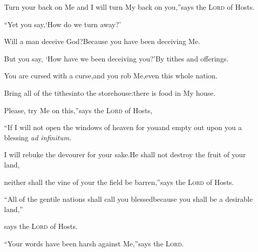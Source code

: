 \begin{inparaenum}
  \pb Turn your back on Me and I will turn My back on you,''\pa says the \textsc{Lord} of Hosts.%
  
  \pb ``Yet you say,\pa `How do we turn away?'%
  
  \pa {} Will a man deceive%
  God?\pa Because you have been deceiving Me.%
  
  \pb But you say, `How have we been deceiving you?'\pa By tithes and offerings.%
  
  \pa {} You are cursed with a curse,\pa and you rob Me,\pa even this whole nation.%
  
  \pa {} Bring all of the tithes\pa into the storehouse:\pa there is food in My house.%
  
  \pb Please, try Me on this,''\pa says the \textsc{Lord} of Hosts,%
  
  \pb ``If I will not open the windows of heaven for you\pa and empty out upon you a blessing \textit{ad infinitum}.%
  
  \pa {} I will rebuke the devourer for your sake.\pa He shall not destroy the fruit of your land,%
  
  \pb neither shall the vine of your the field be barren,''\pa says the \textsc{Lord} of Hosts.%
  
  \pa {} ``All of the gentile nations shall call you blessed\pa because you shall be a desirable land,''%
  
  \pa says the \textsc{Lord} of Hosts.%
  
  \pa {} ``Your words have been harsh against Me,''\pa says the \textsc{Lord}.%
  

\end{inparaenum}
